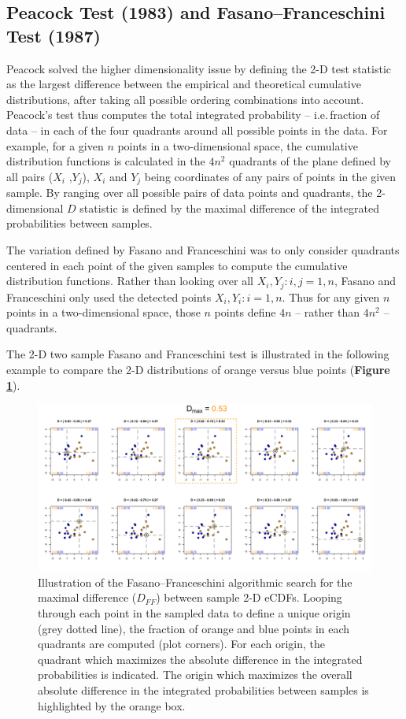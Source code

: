 \documentclass[codesnippet]{jss}
\begin{document}
\subsection{Peacock Test (1983) and Fasano--Franceschini Test (1987)}
Peacock solved the higher dimensionality issue by defining the 2-D test statistic as the largest difference between the empirical and theoretical cumulative distributions, after taking all possible ordering combinations into account. Peacock's test thus computes the total integrated probability -- i.e.\,fraction of data -- in each of the four quadrants around all possible points in the data. For example, for a given $n$ points in a two-dimensional space, the cumulative distribution functions is calculated in the $4n^2$ quadrants of the plane defined by all pairs ($X_i$ ,$Y_j$), $X_i$ and $Y_j$ being coordinates of any pairs of points in the given sample. By ranging over all possible pairs of data points and quadrants, the 2-dimensional $D$ statistic is defined by the maximal difference of the integrated probabilities between samples.

The variation defined by Fasano and Franceschini was to only consider quadrants centered in each point of the given samples to compute the cumulative distribution functions.  Rather than looking over all $X_i, Y_j: i,j={1,n}$, Fasano and Franceschini only used the detected points $X_i, Y_i : i={1,n}$. Thus for any given $n$ points in a two-dimensional space, those $n$ points define $4n$ -- rather than $4n^2$ -- quadrants.

The 2-D two sample Fasano and Franceschini test is illustrated in the following example to compare the 2-D distributions of orange versus blue points (\textbf{Figure \ref{fig:kstest2D}}).

\begin{figure}[t!]
\centering
\includegraphics{fftestOutput}
\caption{\label{fig:kstest2D} Illustration of the Fasano--Franceschini algorithmic search for the maximal difference ($D_{FF}$) between sample 2-D eCDFs. Looping through each point in the sampled data to define a unique origin (grey dotted line), the fraction of orange and blue points in each quadrants are computed (plot corners). For each origin, the quadrant which maximizes the absolute difference in the integrated probabilities is indicated. The origin which maximizes the overall absolute difference in the integrated probabilities between samples is highlighted by the orange box. 
}
\end{figure}
\end{document}
